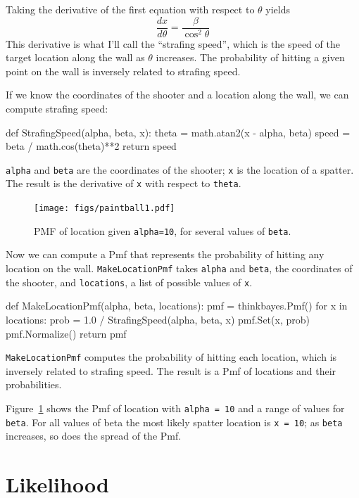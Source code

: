 \documentclass[12pt]{book}
\theoremstyle{exercise}
\begin{document}
Taking the derivative of the first equation with respect to
$\theta$ yields
%
\[ \frac{dx}{d\theta} = \frac{\beta}{\cos^2 \theta} \]
%
This derivative is what I'll call the ``strafing speed'',
which is the speed of the target location along the wall as $\theta$
increases.  The probability of hitting a given point on the wall is
inversely related to strafing speed.

If we know the coordinates of the shooter and a location 
along the wall, we can compute strafing speed:

\begin{code}
def StrafingSpeed(alpha, beta, x):
    theta = math.atan2(x - alpha, beta)
    speed = beta / math.cos(theta)**2
    return speed
\end{code}

{\tt alpha} and {\tt beta} are the coordinates of the shooter;
{\tt x} is the location of a spatter.  The result is
the derivative of {\tt x} with respect to {\tt theta}.

\begin{figure}
\centerline{\texttt{[image: figs/paintball1.pdf]}}
\caption{PMF of location given {\tt alpha=10}, for several values of
  {\tt beta}.}
\label{fig.paintball1}
\end{figure}

Now we can compute a Pmf that represents the probability of hitting
any location on the wall.  {\tt MakeLocationPmf} takes {\tt alpha} and
{\tt beta}, the coordinates of the shooter, and {\tt locations}, a
list of possible values of {\tt x}.

\begin{code}
def MakeLocationPmf(alpha, beta, locations):
    pmf = thinkbayes.Pmf()
    for x in locations:
        prob = 1.0 / StrafingSpeed(alpha, beta, x)
        pmf.Set(x, prob)
    pmf.Normalize()
    return pmf
\end{code}

{\tt MakeLocationPmf} computes the probability of hitting
each location, which is inversely related to
strafing speed.  The result is a Pmf of locations and their
probabilities.

Figure~\ref{fig.paintball1} shows the Pmf of location with {\tt alpha
  = 10} and a range of values for {\tt beta}.  For all values of beta
the most likely spatter location is {\tt x = 10}; as {\tt beta}
increases, so does the spread of the Pmf.



\section{Likelihood}
\end{document}
